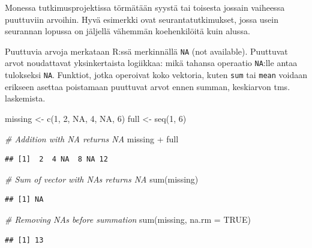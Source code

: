 \documentclass[
]{book}
\newenvironment{Shaded}{\begin{snugshade}}{\end{snugshade}}
\newcommand{\AttributeTok}[1]{\textcolor[rgb]{0.77,0.63,0.00}{#1}}
\newcommand{\CommentTok}[1]{\textcolor[rgb]{0.56,0.35,0.01}{\textit{#1}}}
\newcommand{\ConstantTok}[1]{\textcolor[rgb]{0.00,0.00,0.00}{#1}}
\newcommand{\DecValTok}[1]{\textcolor[rgb]{0.00,0.00,0.81}{#1}}
\newcommand{\FunctionTok}[1]{\textcolor[rgb]{0.00,0.00,0.00}{#1}}
\newcommand{\NormalTok}[1]{#1}
\newcommand{\OtherTok}[1]{\textcolor[rgb]{0.56,0.35,0.01}{#1}}
\newcommand{\SpecialCharTok}[1]{\textcolor[rgb]{0.00,0.00,0.00}{#1}}
\begin{document}
Monessa tutkimusprojektissa törmätään syystä tai toisesta jossain vaiheessa puuttuviin arvoihin. Hyvä esimerkki ovat seurantatutkimukset, jossa usein seurannan lopussa on jäljellä vähemmän koehenkilöitä kuin alussa.

Puuttuvia arvoja merkataan R:ssä merkinnällä \texttt{NA} (not available). Puuttuvat arvot noudattavat yksinkertaista logiikkaa: mikä tahansa operaatio \texttt{NA}:lle antaa tulokseksi \texttt{NA}. Funktiot, jotka operoivat koko vektoria, kuten \texttt{sum} tai \texttt{mean} voidaan erikseen asettaa poistamaan puuttuvat arvot ennen summan, keskiarvon tms. laskemista.

\begin{Shaded}
\begin{Highlighting}[]
\NormalTok{missing }\OtherTok{\textless{}{-}} \FunctionTok{c}\NormalTok{(}\DecValTok{1}\NormalTok{, }\DecValTok{2}\NormalTok{, }\ConstantTok{NA}\NormalTok{, }\DecValTok{4}\NormalTok{, }\ConstantTok{NA}\NormalTok{, }\DecValTok{6}\NormalTok{)}
\NormalTok{full }\OtherTok{\textless{}{-}} \FunctionTok{seq}\NormalTok{(}\DecValTok{1}\NormalTok{, }\DecValTok{6}\NormalTok{)}

\CommentTok{\# Addition with NA returns NA}
\NormalTok{missing }\SpecialCharTok{+}\NormalTok{ full}
\end{Highlighting}
\end{Shaded}

\begin{verbatim}
## [1]  2  4 NA  8 NA 12
\end{verbatim}

\begin{Shaded}
\begin{Highlighting}[]
\CommentTok{\# Sum of vector with NAs returns NA}
\FunctionTok{sum}\NormalTok{(missing)}
\end{Highlighting}
\end{Shaded}

\begin{verbatim}
## [1] NA
\end{verbatim}

\begin{Shaded}
\begin{Highlighting}[]
\CommentTok{\# Removing NAs before summation}
\FunctionTok{sum}\NormalTok{(missing, }\AttributeTok{na.rm =} \ConstantTok{TRUE}\NormalTok{)}
\end{Highlighting}
\end{Shaded}

\begin{verbatim}
## [1] 13
\end{verbatim}
\end{document}
